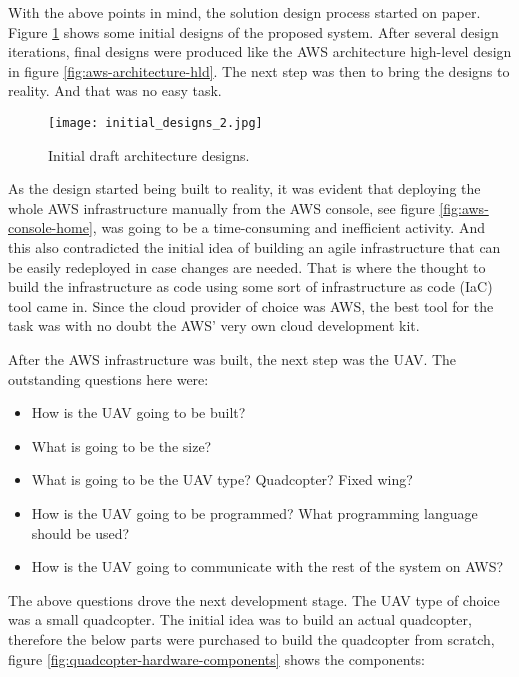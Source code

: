 With the above points in mind, the solution design process started on paper. Figure \ref{fig:initial-draft-designs} shows some initial designs of the proposed system. After several design iterations, final designs were produced like the AWS architecture high-level design in figure \ref{fig:aws-architecture-hld}. The next step was then to bring the designs to reality. And that was no easy task.

\begin{figure}[H]
    \centering \texttt{[image: initial\_designs\_2.jpg]}
    \caption{Initial draft architecture designs.}
    \label{fig:initial-draft-designs}
\end{figure}

As the design started being built to reality, it was evident that deploying the whole AWS infrastructure manually from the AWS console, see figure \ref{fig:aws-console-home}, was going to be a time-consuming and inefficient activity. And this also contradicted the initial idea of building an agile infrastructure that can be easily redeployed in case changes are needed. That is where the thought to build the infrastructure as code using some sort of infrastructure as code (IaC) tool came in. Since the cloud provider of choice was AWS, the best tool for the task was with no doubt the AWS' very own cloud development kit\cite{awscdkdocumentation}.

After the AWS infrastructure was built, the next step was the UAV. The outstanding questions here were:

\begin{itemize}
    \item How is the UAV going to be built?
    \item What is going to be the size?
    \item What is going to be the UAV type? Quadcopter? Fixed wing?
    \item How is the UAV going to be programmed? What programming language should be used?
    \item How is the UAV going to communicate with the rest of the system on AWS?
\end{itemize}

The above questions drove the next development stage. The UAV type of choice was a small quadcopter. The initial idea was to build an actual quadcopter, therefore the below parts were purchased to build the quadcopter from scratch, figure \ref{fig:quadcopter-hardware-components} shows the components:

